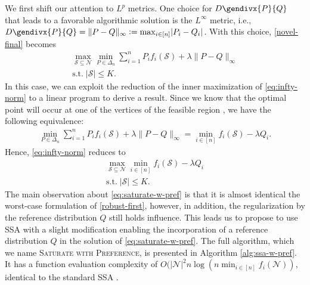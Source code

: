 \documentclass[letter,11pt]{article}
\newcommand{\gendiv}{D\gendivx}
\def\sS{\mathcal{S}}
\def\sN{\mathcal{N}}
\begin{document}
We first shift our attention to $L^p$ metrics. One choice for $\gendiv{P}{Q}$ that leads to a favorable algorithmic solution is the $L^\infty$ metric, i.e., $\gendiv{P}{Q} = \lVert P - Q \rVert_\infty \vcentcolon= \max_{i\in[n]} \lvert P_i - Q_i\rvert$. With this choice, \eqref{novel-final} becomes
\begin{equation}\label{eq:infty-norm}
\begin{gathered}
\max_{\sS \subseteq \sN} \min_{P \in \Delta_n} \sum^n_{i=1} P_i f_i(\sS) + \lambda\lVert P - Q \rVert_\infty\\
\text{s.t.}\; \lvert \sS\rvert \leq K.
\end{gathered}
\end{equation}
In this case, we can exploit the reduction of the inner maximization of \eqref{eq:infty-norm} to a linear program to derive a result. Since we know that the optimal point will occur at one of the vertices of the feasible region \cite{bertsimas-LPbook}, we have the following equivalence:
\begin{equation}\label{eq:equivalence}
\begin{split}
\min_{P \in \Delta_n} \sum^n_{i=1} P_i f_i(\sS) + \lambda\lVert P - Q \rVert_\infty
=
\min_{i \in [n]} f_i(\sS) - \lambda Q_i.
\end{split}
\end{equation}
Hence, \eqref{eq:infty-norm} reduces to
\begin{equation}\label{eq:saturate-w-pref}
\begin{gathered}
\max_{\sS \subseteq \sN} \min_{i \in [n]} f_i(\sS) - \lambda Q_i\\
\text{s.t.}\; \lvert \sS\rvert \leq K.
\end{gathered}
\end{equation}
The main observation about \eqref{eq:saturate-w-pref} is that it is almost identical the worst-case formulation of \eqref{robust-first}, however, in addition, the regularization by the reference distribution $Q$ still holds influence. This leads us to propose to use SSA with a slight modification enabling the incorporation of a reference distribution $Q$ in the solution of \eqref{eq:saturate-w-pref}. The full algorithm, which we name \textsc{Saturate with Preference}, is presented in Algorithm \ref{alg:ssa-w-pref}. It has a function evaluation complexity of $O(\lvert \sN\rvert^2 n \log(n \min_{i\in[n]} f_i (\sN))$, identical to the standard SSA \cite{RSOS}.
\end{document}
